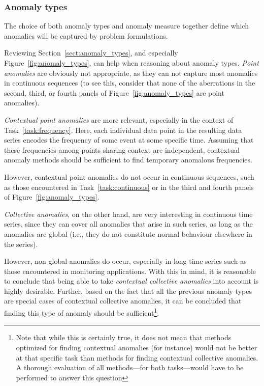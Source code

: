 \subsubsection{Anomaly types}

The choice of both anomaly types and anomaly measure together define which anomalies will be captured by problem formulations.

Reviewing Section~\ref{sect:anomaly_types}, and especially Figure~\ref{fig:anomaly_types}, can help when reasoning about anomaly types. \emph{Point anomalies} are obviously not appropriate, as they can not capture most anomalies in continuous sequences (to see this, consider that none of the aberrations in the second, third, or fourth panels of Figure~\ref{fig:anomaly_types} are point anomalies).

\emph{Contextual point anomalies} are more relevant, especially in the context of Task~\ref{task:frequency}. Here, each individual data point in the resulting data series encodes the frequency of some event at some specific time. Assuming that these frequencies among points sharing context are independent, contextual anomaly methods should be sufficient to find temporary anomalous frequencies.

However, contextual point anomalies do not occur in continuous sequences, such as those encountered in Task~\ref{task:continuous} or in the third and fourth panels of Figure~\ref{fig:anomaly_types}.

\emph{Collective anomalies}, on the other hand, are very interesting in continuous time series, since they can cover all anomalies that arise in such series, as long as the anomalies are global (i.e.\@, they do not constitute normal behaviour elsewhere in the series).

However, non-global anomalies do occur, especially in long time series such as those encountered in monitoring applications. With this in mind, it is reasonable to conclude that being able to take \emph{contextual collective anomalies} into account is highly desirable. Further, based on the fact that all the previous anomaly types are special cases of contextual collective anomalies, it can be concluded that finding this type of anomaly should be sufficient\footnote{Note that while this is certainly true, it does not mean that methods optimized for finding contextual anomalies (for instance) would not be better at that specific task than methods for finding contextual collective anomalies. A thorough evaluation of all methods---for both tasks---would have to be performed to answer this question}.

